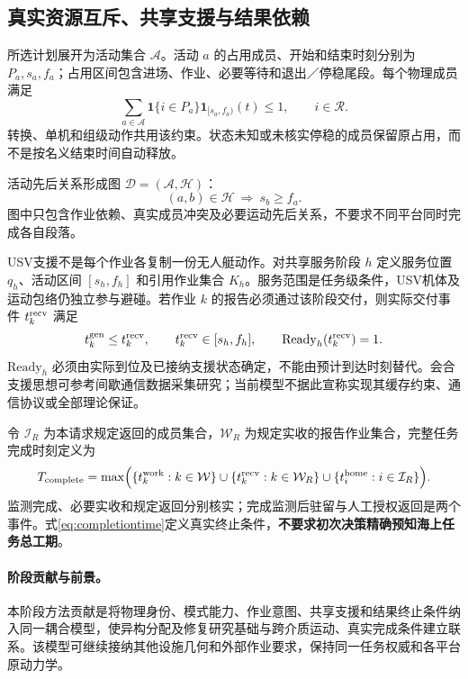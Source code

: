 \documentclass[UTF8,fontset=fandol,a4paper,11pt]{ctexart}
\newcommand{\ind}{\mathbf 1}
\begin{document}
\subsection{真实资源互斥、共享支援与结果依赖}

所选计划展开为活动集合 $\mathcal A$。活动 $a$ 的占用成员、开始和结束时刻分别为 $P_a,s_a,f_a$；占用区间包含进场、作业、必要等待和退出／停稳尾段。每个物理成员满足
\begin{equation}
 \sum_{a\in\mathcal A}\ind\{i\in P_a\}
       \ind_{[s_a,f_a)}(t)\leq 1,
 \qquad i\in\mathcal R.
 \label{eq:resource}
\end{equation}
转换、单机和组级动作共用该约束。状态未知或未核实停稳的成员保留原占用，而不是按名义结束时间自动释放。

活动先后关系形成图 $\mathcal D=(\mathcal A,\mathcal H)$：
\begin{equation}
 (a,b)\in\mathcal H\ \Longrightarrow\ s_b\geq f_a.
 \label{eq:precedence}
\end{equation}
图中只包含作业依赖、真实成员冲突及必要运动先后关系，不要求不同平台同时完成各自段落。

USV支援不是每个作业各复制一份无人艇动作。对共享服务阶段 $h$ 定义服务位置 $q_h$、活动区间 $[s_h,f_h]$ 和引用作业集合 $K_h$。服务范围是任务级条件，USV机体及运动包络仍独立参与避碰。若作业 $k$ 的报告必须通过该阶段交付，则实际交付事件 $t_k^{\rm recv}$ 满足
\begin{equation}
 t_k^{\rm gen}\leq t_k^{\rm recv},\qquad
 t_k^{\rm recv}\in[s_h,f_h],\qquad
 \mathrm{Ready}_h(t_k^{\rm recv})=1.
 \label{eq:service}
\end{equation}
$\mathrm{Ready}_h$ 必须由实际到位及已接纳支援状态确定，不能由预计到达时刻替代。会合支援思想可参考间歇通信数据采集研究\cite{guo}；当前模型不据此宣称实现其缓存约束、通信协议或全部理论保证。

令 $\mathcal I_R$ 为本请求规定返回的成员集合，$\mathcal W_R$ 为规定实收的报告作业集合，完整任务完成时刻定义为
\begin{equation}
 T_{\rm complete}=
 \max\Bigl(\{t_k^{\rm work}:k\in\mathcal W\}
       \cup\{t_k^{\rm recv}:k\in\mathcal W_R\}
       \cup\{t_i^{\rm home}:i\in\mathcal I_R\}\Bigr).
 \label{eq:completiontime}
\end{equation}
监测完成、必要实收和规定返回分别核实；完成监测后驻留与人工授权返回是两个事件。式\eqref{eq:completiontime}定义真实终止条件，\textbf{不要求初次决策精确预知海上任务总工期}。

\paragraph{阶段贡献与前景。}
本阶段方法贡献是将物理身份、模式能力、作业意图、共享支援和结果终止条件纳入同一耦合模型，使异构分配及修复研究基础\cite{calvo,ditags}与跨介质运动、真实完成条件建立联系。该模型可继续接纳其他设施几何和外部作业要求，保持同一任务权威和各平台原动力学。
\end{document}
